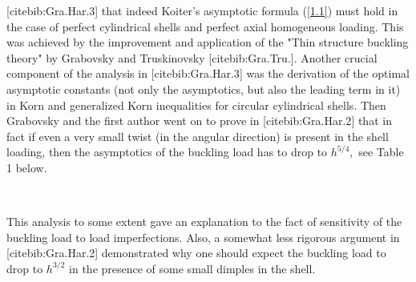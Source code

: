 [cite{bib:Gra.Har.3}] that indeed Koiter's asymptotic formula (\ref{1.1}) must hold in the case of perfect cylindrical shells and perfect axial homogeneous loading. This was achieved by the improvement and application of the "Thin structure buckling theory" by Grabovsky and Truskinovsky [cite{bib:Gra.Tru.}]. Another crucial component of the analysis in [cite{bib:Gra.Har.3}] was the derivation of the optimal asymptotic constants (not only the asymptotics, but also the leading term in it) in Korn and generalized Korn inequalities for circular cylindrical shells. Then Grabovsky and the first author went on to prove in [cite{bib:Gra.Har.2}] that in fact if even a very small twist (in the angular direction) is present in the shell loading, then the asymptotics of the buckling load has to drop to $h^{5/4},$ see Table 1 below.

\begin{table}[h]
\centering
{}\\
\caption{The dependence of the critical buckling load of circular cylindrical shells on the type of loading. Vertical load versus vertical load with a small twist.}
\end{table}
This analysis to some extent gave an explanation to the fact of sensitivity of the buckling load to load imperfections. Also, a somewhat less rigorous argument in [cite{bib:Gra.Har.2}] demonstrated why one should expect the buckling load to drop to $h^{3/2}$ in the presence of some small dimples in the shell. 

